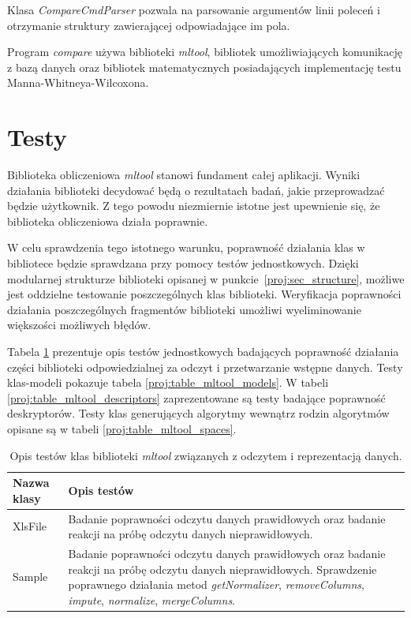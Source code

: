 \documentclass[../thesis.tex]{subfiles}
\begin{document}
Klasa \emph{CompareCmdParser} pozwala na parsowanie argumentów linii poleceń i otrzymanie struktury zawierającej odpowiadające im pola. 

Program \emph{compare} używa biblioteki \emph{mltool}, bibliotek umożliwiających komunikację z bazą danych oraz bibliotek matematycznych posiadających implementację testu Manna-Whitneya-Wilcoxona.

\section{Testy}

Biblioteka obliczeniowa \emph{mltool} stanowi fundament całej aplikacji. Wyniki działania biblioteki decydować będą o rezultatach badań, jakie przeprowadzać będzie użytkownik. Z tego powodu niezmiernie istotne jest upewnienie się, że biblioteka obliczeniowa działa poprawnie. 

W celu sprawdzenia tego istotnego warunku, poprawność działania klas w bibliotece będzie sprawdzana przy pomocy testów jednostkowych. Dzięki modularnej strukturze biblioteki opisanej w punkcie~\ref{proj:sec_structure}, możliwe jest oddzielne testowanie poszczególnych klas biblioteki. Weryfikacja poprawności działania poszczególnych fragmentów biblioteki umożliwi wyeliminowanie większości możliwych błędów.

Tabela \ref{proj:table_mltool_input} prezentuje opis testów jednostkowych badających poprawność działania części biblioteki odpowiedzialnej za odczyt i przetwarzanie wstępne danych. Testy klas-modeli pokazuje tabela \ref{proj:table_mltool_models}. W tabeli \ref{proj:table_mltool_descriptors} zaprezentowane są testy badające poprawność deskryptorów. Testy klas generujących algorytmy wewnątrz rodzin algorytmów opisane są w tabeli \ref{proj:table_mltool_spaces}.

\begin{table}[h]
\begin{center}
\begin{tabular}{ | l | p{110mm} | }
\hline
\rowcolor{lightgray} Nazwa klasy & Opis testów \\\hline

XlsFile & Badanie poprawności odczytu danych prawidłowych oraz badanie reakcji na próbę odczytu danych nieprawidłowych. \\\hline
Sample & Badanie poprawności odczytu danych prawidłowych oraz badanie reakcji na próbę odczytu danych nieprawidłowych. Sprawdzenie poprawnego działania metod \emph{getNormalizer}, \emph{removeColumns}, \emph{impute}, \emph{normalize}, \emph{mergeColumns}.\\\hline

\end{tabular}
\caption{Opis testów klas biblioteki \emph{mltool} związanych z odczytem i reprezentacją danych.}
\label{proj:table_mltool_input}
\end{center}
\end{table}
\end{document}
